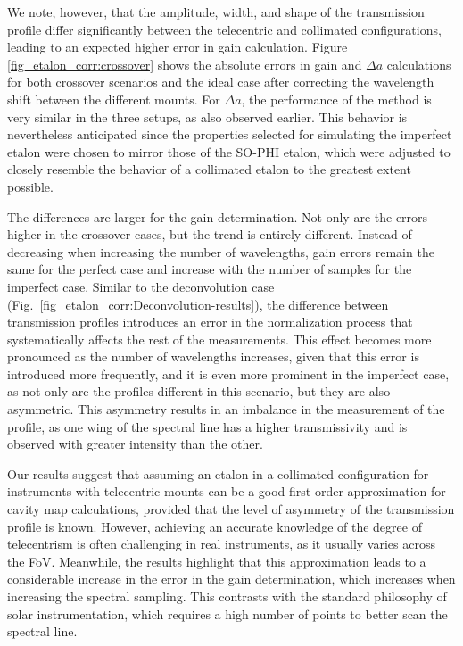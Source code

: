 We note, however, that the amplitude, width, and shape of the transmission profile differ significantly between the telecentric and collimated configurations, leading to an expected higher error in gain calculation. Figure \ref{fig_etalon_corr:crossover} shows the absolute errors in gain and $\Delta a$ calculations for both crossover scenarios and the ideal case after correcting the wavelength shift between the different mounts. For $\Delta a$, the performance of the method is very similar in the three setups, as also observed earlier. This behavior is nevertheless anticipated since the properties selected for simulating the imperfect etalon were chosen to mirror those of the SO-PHI etalon, which were adjusted to closely resemble the behavior of a collimated etalon to the greatest extent possible.

The differences are larger for the gain determination. Not only are the errors higher in the crossover cases, but the trend is entirely different. Instead of decreasing when increasing the number of wavelengths, gain errors remain the same for the perfect case and increase with the number of samples for the imperfect case. Similar to the deconvolution case (Fig.~\ref{fig_etalon_corr:Deconvolution-results}), the difference between transmission profiles introduces an error in the normalization process that systematically affects the rest of the measurements. This effect becomes more pronounced as the number of wavelengths increases, given that this error is introduced more frequently, and it is even more prominent in the imperfect case, as not only are the profiles different in this scenario, but they are also asymmetric. This asymmetry results in an imbalance in the measurement of the profile, as one wing of the spectral line has a higher transmissivity and is observed with greater intensity than the other.

Our results suggest that assuming an etalon in a collimated configuration for instruments with telecentric mounts can be a good first-order approximation for cavity map calculations, provided that the level of asymmetry of the transmission profile is known. However, achieving an accurate knowledge of the degree of telecentrism is often challenging in real instruments, as it usually varies across the FoV. Meanwhile, the results highlight that this approximation leads to a considerable increase in the error in the gain determination, which increases when increasing the spectral sampling. This contrasts with the standard philosophy of solar instrumentation, which requires a high number of points to better scan the spectral line.

